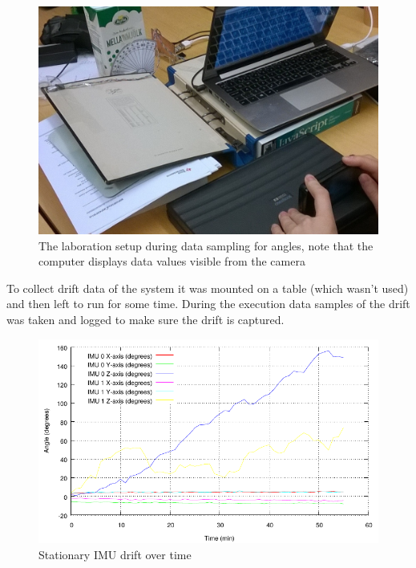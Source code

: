 \documentclass[a4paper, 12pt]{article}
\begin{document}
\begin{figure}[h!]
    \centering
    \includegraphics[scale=0.27]{croped.jpg}
    \caption{The laboration setup during data sampling for angles, note that the computer displays data values visible from the camera}
    \label{fig:pic7}
\end{figure}

To collect drift data of the system it was mounted on a table (which wasn't used) and then left to run for some time. During the execution data samples of the drift was taken and logged to make sure the drift is captured.     

\begin{figure}[h!]
    \centering
    \includegraphics[scale=1.15]{drift.pdf}
    \caption{Stationary IMU drift over time}
    \label{fig:pic8}
\end{figure}
\end{document}
